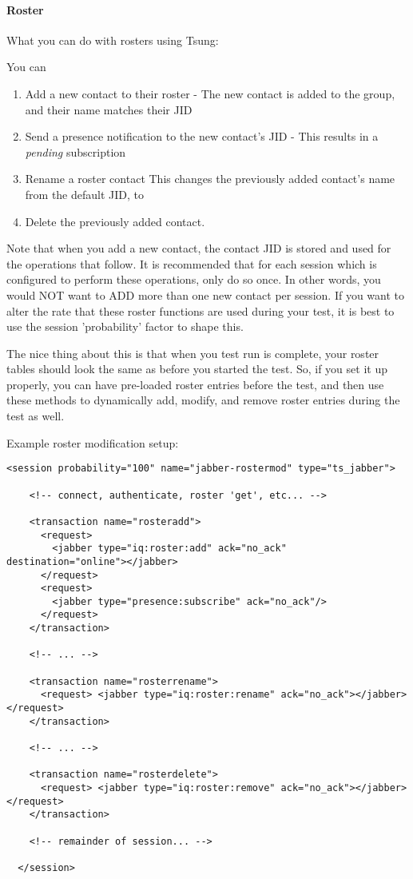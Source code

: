 \documentclass{TSUNG-en}
\begin{document}
\paragraph{Roster}

What you can do with rosters using Tsung:

You can
\begin{enumerate}
\item  Add a new contact to their roster
   - The new contact is added to the  group, and their name matches their JID
\item  Send a  presence notification to the new contact's JID
   - This results in a \emph{pending} subscription
 \item  Rename a roster contact
    This changes the previously added contact's name from the default JID, to 
  \item Delete the previously added contact.
\end{enumerate}

Note that when you add a new contact, the contact JID is stored and used for the operations that follow. It is recommended that for each session which is configured to perform these operations, only do so once. In other words, you would NOT want to ADD more than one new contact per session. If you want to alter the rate that these roster functions are used during your test, it is best to use the session 'probability' factor to shape this.

The nice thing about this is that when you test run is complete, your roster tables should look the same as before you started the test. So, if you set it up properly, you can have pre-loaded roster entries before the test, and then use these methods to dynamically add, modify, and remove roster entries during the test as well.

Example roster modification setup:

\begin{Verbatim}
<session probability="100" name="jabber-rostermod" type="ts_jabber">

    <!-- connect, authenticate, roster 'get', etc... -->

    <transaction name="rosteradd">
      <request>
        <jabber type="iq:roster:add" ack="no_ack" destination="online"></jabber>
      </request>
      <request>
        <jabber type="presence:subscribe" ack="no_ack"/>
      </request>
    </transaction>

    <!-- ... -->

    <transaction name="rosterrename">
      <request> <jabber type="iq:roster:rename" ack="no_ack"></jabber> </request>
    </transaction>

    <!-- ... -->

    <transaction name="rosterdelete">
      <request> <jabber type="iq:roster:remove" ack="no_ack"></jabber> </request>
    </transaction>

    <!-- remainder of session... -->

  </session>
\end{Verbatim}
\end{document}

